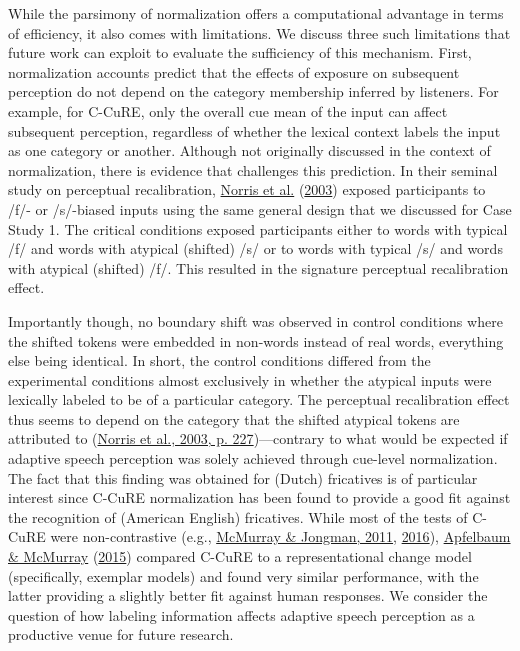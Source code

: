 \documentclass[
  11pt,
  english,
  man,floatsintext]{apa6}
\begin{document}
While the parsimony of normalization offers a computational advantage in terms of efficiency, it also comes with limitations. We discuss three such limitations that future work can exploit to evaluate the sufficiency of this mechanism. First, normalization accounts predict that the effects of exposure on subsequent perception do not depend on the category membership inferred by listeners. For example, for C-CuRE, only the overall cue mean of the input can affect subsequent perception, regardless of whether the lexical context labels the input as one category or another. Although not originally discussed in the context of normalization, there is evidence that challenges this prediction. In their seminal study on perceptual recalibration, \protect\hyperlink{ref-norris2003}{Norris et al.} (\protect\hyperlink{ref-norris2003}{2003}) exposed participants to /f/- or /s/-biased inputs using the same general design that we discussed for Case Study 1. The critical conditions exposed participants either to words with typical /f/ and words with atypical (shifted) /s/ or to words with typical /s/ and words with atypical (shifted) /f/. This resulted in the signature perceptual recalibration effect.

Importantly though, no boundary shift was observed in control conditions where the shifted tokens were embedded in non-words instead of real words, everything else being identical. In short, the control conditions differed from the experimental conditions almost exclusively in whether the atypical inputs were lexically labeled to be of a particular category. The perceptual recalibration effect thus seems to depend on the category that the shifted atypical tokens are attributed to (\protect\hyperlink{ref-norris2003}{Norris et al., 2003, p. 227})---contrary to what would be expected if adaptive speech perception was solely achieved through cue-level normalization. The fact that this finding was obtained for (Dutch) fricatives is of particular interest since C-CuRE normalization has been found to provide a good fit against the recognition of (American English) fricatives. While most of the tests of C-CuRE were non-contrastive (e.g., \protect\hyperlink{ref-mcmurray-jongman2011}{McMurray \& Jongman, 2011}, \protect\hyperlink{ref-mcmurray-jongman2016}{2016}), \protect\hyperlink{ref-apfelbaum-mcmurray2015}{Apfelbaum \& McMurray} (\protect\hyperlink{ref-apfelbaum-mcmurray2015}{2015}) compared C-CuRE to a representational change model (specifically, exemplar models) and found very similar performance, with the latter providing a slightly better fit against human responses. We consider the question of how labeling information affects adaptive speech perception as a productive venue for future research.
\end{document}
